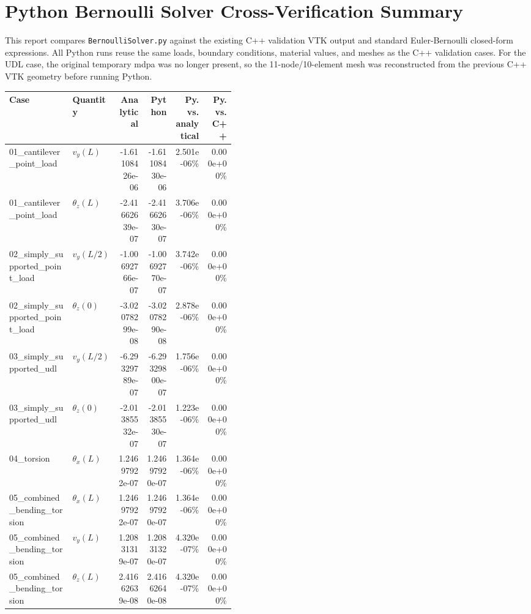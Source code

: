 \documentclass[11pt]{article}
\begin{document}
\section*{Python Bernoulli Solver Cross-Verification Summary}
This report compares \texttt{BernoulliSolver.py} against the existing C++ validation VTK output and standard Euler-Bernoulli closed-form expressions. All Python runs reuse the same loads, boundary conditions, material values, and meshes as the C++ validation cases. For the UDL case, the original temporary mdpa was no longer present, so the 11-node/10-element mesh was reconstructed from the previous C++ VTK geometry before running Python.

\begin{center}
\begin{tabular}{|p{0.29\linewidth}|p{0.14\linewidth}|r|r|r|r|}
\hline
Case & Quantity & Analytical & Python & Py. vs. analytical & Py. vs. C++ \\
\hline
01\_cantilever\_point\_load & $v_y(L)$ & -1.61108426e-06 & -1.61108430e-06 & 2.501e-06\% & 0.000e+00\% \\
01\_cantilever\_point\_load & $\theta_z(L)$ & -2.41662639e-07 & -2.41662630e-07 & 3.706e-06\% & 0.000e+00\% \\
02\_simply\_supported\_point\_load & $v_y(L/2)$ & -1.00692766e-07 & -1.00692770e-07 & 3.742e-06\% & 0.000e+00\% \\
02\_simply\_supported\_point\_load & $\theta_z(0)$ & -3.02078299e-08 & -3.02078290e-08 & 2.878e-06\% & 0.000e+00\% \\
03\_simply\_supported\_udl & $v_y(L/2)$ & -6.29329789e-07 & -6.29329800e-07 & 1.756e-06\% & 0.000e+00\% \\
03\_simply\_supported\_udl & $\theta_z(0)$ & -2.01385532e-07 & -2.01385530e-07 & 1.223e-06\% & 0.000e+00\% \\
04\_torsion & $\theta_x(L)$ & 1.24697922e-07 & 1.24697920e-07 & 1.364e-06\% & 0.000e+00\% \\
05\_combined\_bending\_torsion & $\theta_x(L)$ & 1.24697922e-07 & 1.24697920e-07 & 1.364e-06\% & 0.000e+00\% \\
05\_combined\_bending\_torsion & $v_y(L)$ & 1.20831319e-07 & 1.20831320e-07 & 4.320e-07\% & 0.000e+00\% \\
05\_combined\_bending\_torsion & $\theta_z(L)$ & 2.41662639e-08 & 2.41662640e-08 & 4.320e-07\% & 0.000e+00\% \\
\hline
\end{tabular}
\end{center}
\end{document}
